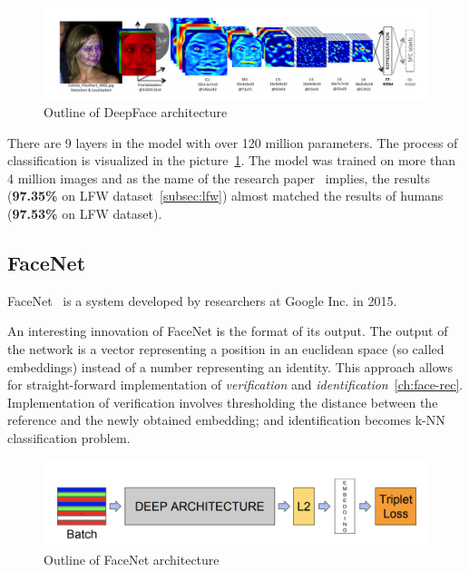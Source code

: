 \begin{figure}[H]
    \centering
    \includegraphics[width=\columnwidth]{images/face-recognition/deepface.png}
    \caption{Outline of DeepFace architecture~\cite{DeepFace}}
    \label{fig:deepface}
\end{figure}

There are 9 layers in the model with over 120 million parameters.
The process of classification is visualized in the picture~\ref{fig:deepface}.
The model was trained on more than 4 million images and as the name of the research paper~\cite{DeepFace} implies,
the results (\textbf{97.35\%} on LFW dataset~\ref{subsec:lfw}) almost matched the results of humans (\textbf{97.53\%}
on LFW dataset).


\subsection{FaceNet}\label{subsec:facenet}
FaceNet~\cite{FaceNet} is a system developed by researchers at Google Inc. in 2015.

An interesting innovation of FaceNet is the format of its output.
The output of the network is a vector representing a position in an euclidean space (so called embeddings) instead of a
number representing an identity.
This approach allows for straight-forward implementation of \textit{verification} and
\textit{identification}~\ref{ch:face-rec}.
Implementation of verification involves thresholding the distance between the reference and the newly obtained
embedding; and identification becomes k-NN classification problem.

\begin{figure}[H]
    \centering
    \includegraphics[width=\columnwidth]{images/face-recognition/facenet.png}
    \caption{Outline of FaceNet architecture~\cite{FaceNet}}
    \label{fig:facenet}
\end{figure}

